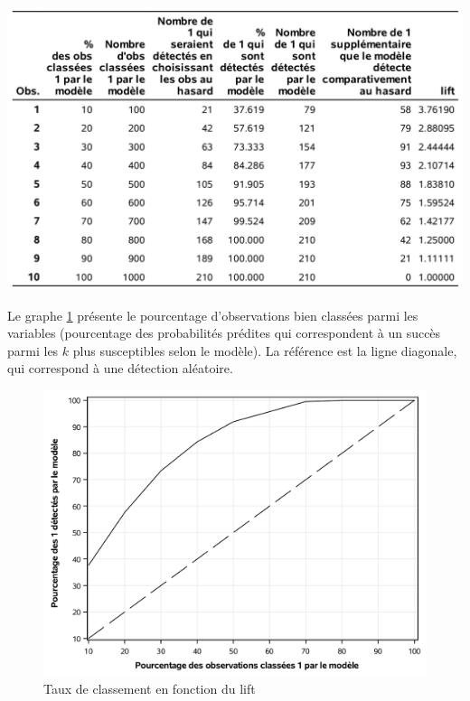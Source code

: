 \documentclass[
  11pt,
  letterpaper,
]{book}
\theoremstyle{definition}
\theoremstyle{definition}
\theoremstyle{definition}
\theoremstyle{remark}
\begin{document}
\begin{center}\includegraphics[width=0.8\linewidth]{figures/03-logistic-e16} \end{center}

Le graphe \ref{fig:fig3-e17} présente le pourcentage d'observations bien classées parmi les variables (pourcentage des probabilités prédites qui correspondent à un succès parmi les \(k\) plus susceptibles selon le modèle). La référence est la ligne diagonale, qui correspond à une détection aléatoire.

\begin{figure}

{\centering \includegraphics[width=0.8\linewidth]{figures/03-logistic-e17} 

}

\caption{Taux de classement en fonction du lift}\label{fig:fig3-e17}
\end{figure}
\end{document}
